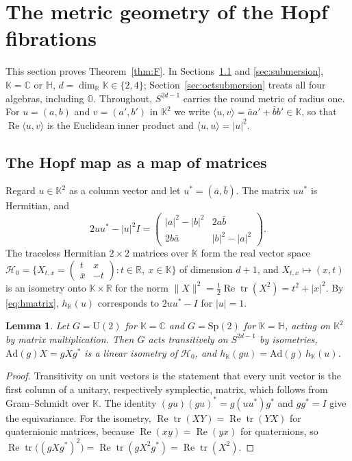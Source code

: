 \documentclass[11pt]{amsart}
\numberwithin{equation}{section}
\theoremstyle{plain}
\newtheorem{lemma}[theorem]{Lemma}
\theoremstyle{definition}
\theoremstyle{remark}
\newcommand{\R}{\mathbb{R}}
\newcommand{\C}{\mathbb{C}}
\newcommand{\Hq}{\mathbb{H}}
\newcommand{\Oc}{\mathbb{O}}
\newcommand{\K}{\mathbb{K}}
\newcommand{\Sp}{\mathrm{Sp}}
\newcommand{\U}{\mathrm{U}}
\renewcommand{\Re}{\operatorname{Re}}
\begin{document}
\section{The metric geometry of the Hopf fibrations}\label{ch:geometry}

This section proves Theorem~\ref{thm:F}. In Sections~\ref{sec:matrices} and \ref{sec:submersion}, $\K=\C$ or $\Hq$, $d=\dim_\R\K\in\{2,4\}$; Section~\ref{sec:octsubmersion} treats all four algebras, including $\Oc$. Throughout, $S^{2d-1}$ carries the round metric of radius one. For $u=(a,b)$ and $v=(a',b')$ in $\K^2$ we write $\langle u,v\rangle=\bar aa'+\bar bb'\in\K$, so that $\Re\langle u,v\rangle$ is the Euclidean inner product and $\langle u,u\rangle=|u|^2$.

\subsection{The Hopf map as a map of matrices}\label{sec:matrices}

Regard $u\in\K^2$ as a column vector and let $u^*=(\bar a,\bar b)$. The matrix $uu^*$ is Hermitian, and
\begin{equation}\label{eq:hmatrix}
2uu^*-|u|^2I=\begin{pmatrix}|a|^2-|b|^2&2a\bar b\\ 2b\bar a&|b|^2-|a|^2\end{pmatrix}.
\end{equation}
The traceless Hermitian $2\times2$ matrices over $\K$ form the real vector space $\mathcal H_0=\{X_{t,x}=\left(\begin{smallmatrix}t&x\\ \bar x&-t\end{smallmatrix}\right):t\in\R,\ x\in\K\}$ of dimension $d+1$, and $X_{t,x}\mapsto(x,t)$ is an isometry onto $\K\times\R$ for the norm $\|X\|^2=\tfrac12\Re\operatorname{tr}(X^2)=t^2+|x|^2$. By \eqref{eq:hmatrix}, $h_\K(u)$ corresponds to $2uu^*-I$ for $|u|=1$.

\begin{lemma}\label{lem:equivariance}
Let $G=\U(2)$ for $\K=\C$ and $G=\Sp(2)$ for $\K=\Hq$, acting on $\K^2$ by matrix multiplication. Then $G$ acts transitively on $S^{2d-1}$ by isometries, $\mathrm{Ad}(g)X=gXg^*$ is a linear isometry of $\mathcal H_0$, and $h_\K(gu)=\mathrm{Ad}(g)\,h_\K(u)$.
\end{lemma}

\begin{proof}
Transitivity on unit vectors is the statement that every unit vector is the first column of a unitary, respectively symplectic, matrix, which follows from Gram--Schmidt over $\K$. The identity $(gu)(gu)^*=g(uu^*)g^*$ and $gg^*=I$ give the equivariance. For the isometry, $\Re\operatorname{tr}(XY)=\Re\operatorname{tr}(YX)$ for quaternionic matrices, because $\Re(xy)=\Re(yx)$ for quaternions, so $\Re\operatorname{tr}\bigl((gXg^*)^2\bigr)=\Re\operatorname{tr}(gX^2g^*)=\Re\operatorname{tr}(X^2)$.
\end{proof}
\end{document}
